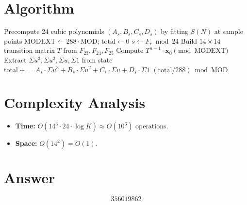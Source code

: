 \documentclass[11pt]{article}
\begin{document}
\section{Algorithm}

\begin{algorithmic}[1]
  \State Precompute 24 cubic polynomials $(A_s, B_s, C_s, D_s)$ by fitting $S(N)$ at sample points
  \State $\mathrm{MODEXT} \gets 288 \cdot \mathrm{MOD}$; \quad $\mathrm{total} \gets 0$
    \State $s \gets F_r \bmod 24$ 
    \State Build $14\times 14$ transition matrix $T$ from $F_{23}, F_{24}, F_{25}$
    \State Compute $T^{n-1} \cdot \mathbf{x}_0 \pmod{\mathrm{MODEXT}}$ 
    \State Extract $\Sigma u^3, \Sigma u^2, \Sigma u, \Sigma 1$ from state
    \State $\mathrm{total} \mathrel{+}= A_s \cdot \Sigma u^3 + B_s \cdot \Sigma u^2 + C_s \cdot \Sigma u + D_s \cdot \Sigma 1$
  \EndFor
  \State \Return $(\mathrm{total} / 288) \bmod \mathrm{MOD}$
\EndFunction
\end{algorithmic}

\section{Complexity Analysis}

\begin{itemize}
  \item \textbf{Time:} $O(14^3 \cdot 24 \cdot \log K) \approx O(10^6)$ operations.
  \item \textbf{Space:} $O(14^2) = O(1)$.
\end{itemize}

\section{Answer}

\[
\boxed{356019862}
\]
\end{document}
